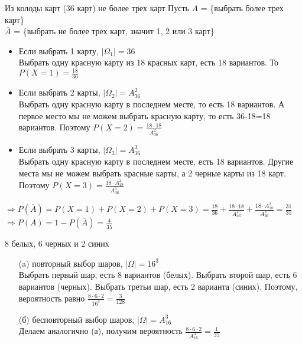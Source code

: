 \begin{exercise}[8] Из колоды карт (36 карт) не более трех карт
	Пусть $A$ = \{выбрать более трех карт\} \\ $\overline{A}$ = \{выбрать не более трех карт, значит 1, 2 или 3 карт\}
	\begin{itemize}
		\item Если выбрать 1 карту, $| \Omega_1 | = 36$ \\ Выбрать одну красную карту из 18 красных карт, есть 18 вариантов. То $P(X=1) = \frac{18}{36}$ 
		\item Если выбрать 2 карты, $| \Omega_2 | = A^2_{36}$ \\ Выбрать одну красную карту в последнем месте, то есть 18 вариантов. А первое место мы не можем выбрать красную карту, то есть 36-18=18 вариантов. Поэтому $P(X=2) = \frac{18 \cdot 18}{A^2_{36}}$
		\item Если выбрать 3 карты, $| \Omega_3 | = A^3_{36}$ \\ Выбрать одну красную карту в последнем месте, есть 18 вариантов. Другие места мы не можем выбрать красные карты, а 2 черные карты из 18 карт. Поэтому $P(X=3) = \frac{18 \cdot A^2_{18}}{A^3_{36}}$
	\end{itemize}
	$\Rightarrow P(\overline{A}) = P(X=1) + P(X=2) + P(X=3) = \frac{18}{36} + \frac{18 \cdot 18}{A^2_{26}} + \frac{18 \cdot A^2_{18}}{A^3_{36}} = \frac{31}{35}$ \\ $\Rightarrow P(A) = 1 - P(\overline{A}) = \frac{4}{35}$
\end{exercise}

\begin{exercise}[9] 8 белых, 6 черных и 2 синих
	\begin{enumerate}
		\item [(a)] повторный выбор шаров, $| \Omega | = {16}^3$ \\ Выбрать первый шар, есть 8 вариантов (белых). Выбрать второй шар, есть 6 вариантов (черных). Выбрать третьи шар, есть 2 варианта (синих). Поэтому, вероятность равно $\frac{8 \cdot 6 \cdot 2}{{16}^3} = \frac{3}{128}$
		\item [(б)] бесповторный выбор шаров, $| \Omega | = A^3_{16}$ \\ Делаем аналогично (а), получим вероятность $\frac{8 \cdot 6 \cdot 2}{A^3_{16}} = \frac{1}{35}$
	\end{enumerate}
\end{exercise}

